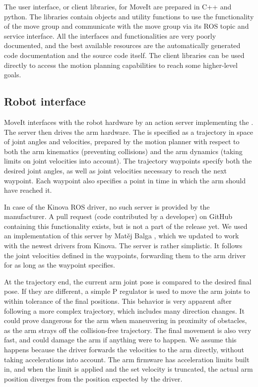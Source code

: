 \documentclass[buriama8_dp.tex]{subfiles}
\begin{document}
The user interface, or client libraries, for MoveIt are prepared in C++ and python. The libraries contain objects and utility functions to use the functionality of the move group and communicate with the move group via its ROS topic and service interface. All the interfaces and functionalities are very poorly documented, and the best available resources are the automatically generated code documentation and the source code itself. The client libraries can be used directly to access the motion planning capabilities to reach some higher-level goals.


\subsection{Robot interface}
\label{subsec:moveit_ri}

MoveIt interfaces with the robot hardware by an action server implementing the . The server then drives the arm hardware. The  is specified as a trajectory in space of joint angles and velocities, prepared by the motion planner with respect to both the arm kinematics (preventing collisions) and the arm dynamics (taking limits on joint velocities into account). The trajectory waypoints specify both the desired joint angles, as well as joint velocities necessary to reach the next waypoint. Each waypoint also specifies a point in time in which the arm should have reached it.

In case of the Kinova ROS driver, no such server is provided by the manufacturer. A pull request (code contributed by a developer) on GitHub containing this functionality exists, but is not a part of the release yet. We used an implementation of this server by Matěj Balga \cite{matej} , which we updated to work with the newest drivers from Kinova. The server is rather simplistic. It follows the joint velocities defined in the waypoints, forwarding them to the arm driver for as long as the waypoint specifies.

At the trajectory end, the current arm joint pose is compared to the desired final pose. If they are different, a simple P regulator is used to move the arm joints to within tolerance of the final positions. This behavior is very apparent after following a more complex trajectory, which includes many direction changes. It could prove dangerous for the arm when maneuvering in proximity of obstacles, as the arm strays off the collision-free trajectory. The final movement is also very fast, and could damage the arm if anything were to happen. We assume this happens because the driver forwards the velocities to the arm directly, without taking accelerations into account. The arm firmware has acceleration limits built in, and when the limit is applied and the set velocity is truncated, the actual arm position diverges from the position expected by the driver.
\end{document}
